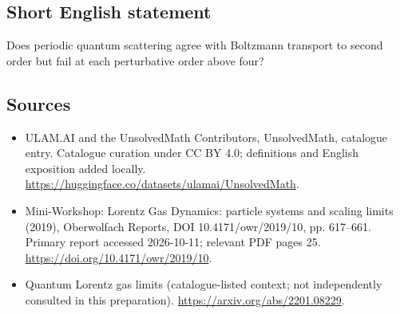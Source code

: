 \documentclass[11pt]{article}
\begin{document}
\subsection{Short English statement}
Does periodic quantum scattering agree with Boltzmann transport to second order but fail at each perturbative order above four?
\subsection{Sources}
\begin{itemize}
\item[\hypertarget{source:statement:1}{S1}] ULAM.AI and the UnsolvedMath Contributors, UnsolvedMath, catalogue entry. Catalogue curation under CC BY 4.0; definitions and English exposition added locally.
\url{https://huggingface.co/datasets/ulamai/UnsolvedMath}.
\item[\hypertarget{source:statement:2}{S2}] Mini-Workshop: Lorentz Gas Dynamics: particle systems and scaling limits (2019), Oberwolfach Reports, DOI 10.4171/owr/2019/10, pp. 617--661. Primary report accessed 2026-10-11; relevant PDF pages 25.
\url{https://doi.org/10.4171/owr/2019/10}.
\item[\hypertarget{source:statement:3}{S3}] Quantum Lorentz gas limits (catalogue-listed context; not independently consulted in this preparation).
\url{https://arxiv.org/abs/2201.08229}.
\end{itemize}
\label{end:statement}
\end{document}
